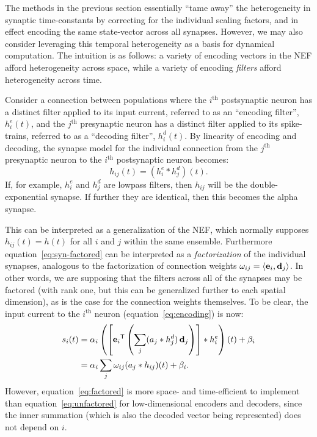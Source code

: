 The methods in the previous section essentially ``tame away'' the heterogeneity in synaptic time-constants by correcting for the individual scaling factors, and in effect encoding the same state-vector across all synapses.
However, we may also consider leveraging this temporal heterogeneity as a basis for dynamical computation.
The intuition is as follows: a variety of encoding vectors in the NEF afford heterogeneity across space, while a variety of encoding \emph{filters} afford heterogeneity across time.

Consider a connection between populations where the $i^\text{th}$ postsynaptic neuron has a distinct filter applied to its input current, referred to as an ``encoding filter'', $h^e_i(t)$, and the $j^\text{th}$ presynaptic neuron has a distinct filter applied to its spike-trains, referred to as a ``decoding filter'', $h^d_i(t)$. 
By linearity of encoding and decoding, the synapse model for the individual connection from the $j^\text{th}$ presynaptic neuron to the $i^\text{th}$ postsynaptic neuron becomes:
\begin{equation} \label{eq:syn-factored}
h_{ij}(t) = (h^e_i \ast h^d_j)(t) \text{.}
\end{equation}
If, for example, $h^e_i$ and $h^d_j$ are lowpass filters, then $h_{ij}$ will be the double-exponential synapse. If further  they are identical, then this becomes the alpha synapse.

This can be interpreted as a generalization of the NEF, which normally supposes $h_{ij}(t) = h(t)$ for all $i$ and $j$ within the same ensemble.
Furthermore equation~\ref{eq:syn-factored} can be interpreted as a \emph{factorization} of the individual synapses, analogous to the factorization of connection weights \mbox{$\omega_{ij} = \left\langle \mathbf{e}_i \text{,}\, \mathbf{d}_j \right \rangle$}.
In other words, we are supposing that the filters across all of the synapses may be factored (with rank one, but this can be generalized further to each spatial dimension), as is the case for the connection weights themselves.
To be clear, the input current to the $i^\text{th}$ neuron (equation~\ref{eq:encoding}) is now:
\begin{align}
s_i(t) &= \alpha_i \left( \left[ {\mathbf{e}_i}^\mathsf{T} \left( \sum_j ( a_j \ast h^d_j) \, \mathbf{d}_j \right) \right] \ast h^e_i \right)(t) + \beta_i \label{eq:factored} \\
       &= \alpha_i \sum_j \omega_{ij} (a_j \ast h_{ij})(t) + \beta_i . \label{eq:unfactored}
\end{align}
However, equation~\ref{eq:factored} is more space- and time-efficient to implement than equation~\ref{eq:unfactored} for low-dimensional encoders and decoders, since the inner summation (which is also the decoded vector being represented) does not depend on $i$.

